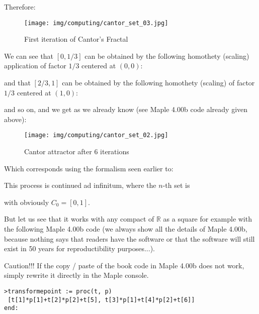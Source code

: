 	Therefore:
	\begin{figure}[H]
		\centering
		\texttt{[image: img/computing/cantor\_set\_03.jpg]}
		\caption{First iteration of Cantor's Fractal}
	\end{figure}
	We can see that $[0,1/3]$ can be obtained by the following homothety (scaling) application of factor $1/3$ centered at $(0,0)$:
	
	and that $[2/3,1]$ can be obtained by the following homothety (scaling) of factor $1/3$ centered at $(1,0)$:
	
	and so on, and we get as we already know (see Maple 4.00b code already given above):
	\begin{figure}[H]
		\centering
		\texttt{[image: img/computing/cantor\_set\_02.jpg]}
		\caption{Cantor attractor after $6$ iterations}
	\end{figure}
	Which corresponds using the formalism seen earlier to:
	
	This process is continued ad infinitum, where the $n$-th set is
	
	with obviously $C_{0}=[0,1]$.
	
	But let us see that it works with any compact of $\mathbb{R}$ as a square for example with the following Maple 4.00b code  (we always show all the details of Maple 4.00b, because nothing says that readers have the software or that the software will still exist in 50 years for reproductibility purposes...).
	
	Caution!!! If the copy / paste of the book code in Maple 4.00b does not work, simply rewrite it directly in the Maple console.
	
	\texttt{>transforme\textunderscore point := proc(t, p)}\\
	\texttt{   [t[1]*p[1]+t[2]*p[2]+t[5], t[3]*p[1]+t[4]*p[2]+t[6]]}\\
  	\texttt{end:}\\

